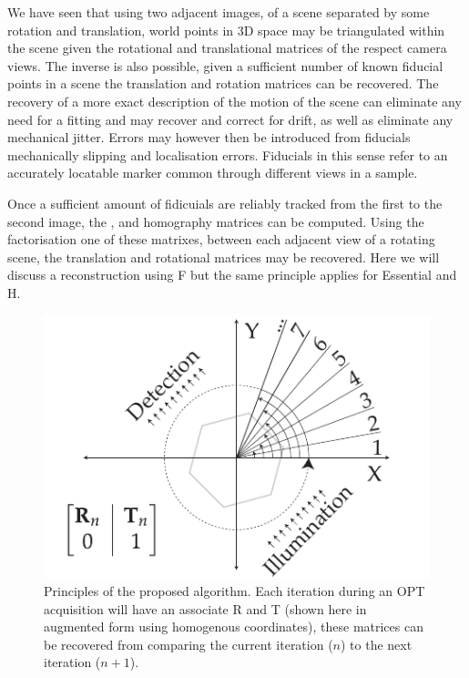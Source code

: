 We have seen that using two adjacent images, of a scene separated by some rotation and translation, world points in \gls{3D} space may be triangulated within the scene given the rotational and translational matrices of the respect camera views.
The inverse is also possible, given a sufficient number of known fiducial points in a scene the translation and rotation matrices can be recovered.
The recovery of a more exact description of the motion of the scene can eliminate any need for a fitting and may recover and correct for drift, as well as eliminate any mechanical jitter.
Errors may however then be introduced from fiducials mechanically slipping and localisation errors.
Fiducials in this sense refer to an accurately locatable marker common through different views in a sample.

Once a sufficient amount of fidicuials are reliably tracked from the first to the second image, the ,  and \Gls{homography} matrices can be computed.
Using the factorisation one of these matrixes, between each adjacent view of a rotating scene, the translation and rotational matrices may be recovered.
Here we will discuss a reconstruction using \gls{F} but the same principle applies for \gls{Essential} and \gls{H}.

\begin{figure}
  \centering
  \includegraphics{Chapters/flopt/Figs/PDF/flOPT_principle}
  \caption[Principles of the proposed algorithm]{Principles of the proposed algorithm. Each iteration during an OPT acquisition will have an associate \gls{R} and \gls{T} (shown here in augmented form using homogenous coordinates), these matrices can be recovered from comparing the current iteration (\(n\)) to the next iteration (\(n+1\)).}
\end{figure}

